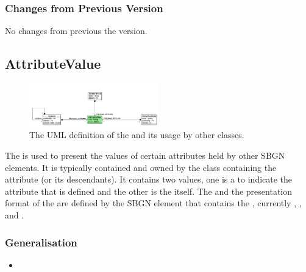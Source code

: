 
\subsubsection{Changes from Previous Version}

No changes from previous the version.

\subsection{AttributeValue}
\label{defn:AttributeValue}

\begin{figure}[htb]
  \centering
  \includegraphics[width = 0.5\textwidth]{images/attributevalueuml}
  \caption{The UML definition of the  and
    its usage by other classes.}
  \label{fig:attributevalueuml}
\end{figure}

 The  is used to present the values of
 certain attributes held by other SBGN elements. It is typically
 contained and owned by the class containing the attribute (or its
 descendants). It contains two values, one is a  to indicate the
 attribute that is defined and the other is the itself. The 
 and the presentation format of the  are defined by the
 SBGN element that contains the , currently
 , , and .


\subsubsection{Generalisation}

\begin{itemize}
\item {}
\end{itemize}


